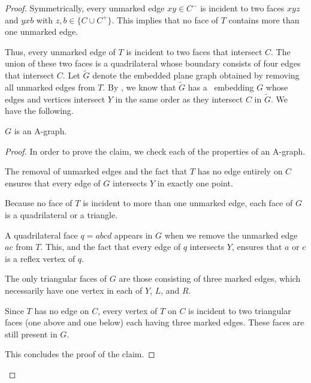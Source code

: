 \begin{proof}
	Symmetrically, every unmarked edge $xy\in C^-$ is incident to two faces
	$xyz$ and $yxb$ with $z,b\in \{C \cup C^+\}$.  This implies that no face of $T$ contains more than one unmarked edge.
	
	Thus, every unmarked edge of $T$ is incident to two faces that intersect $C$. The union of these two faces is a quadrilateral whose boundary consists of four edges that intersect $C$.
	Let $\tilde{G}$ denote the embedded plane graph obtained by removing all unmarked edges
	from $T$.  By , we know that $\tilde G$ has
	a \Fary\ embedding $G$ whose edges and vertices intersect $Y$ in the
	same order as they intersect $C$ in $\tilde{G}$. We have the following.
	
	\begin{claimx} \label{claim-a-graph}
		$G$ is an A-graph.
	\end{claimx}
	
	\begin{proof}
In order to	prove the claim, we check each of the properties of an A-graph.
	
	\begin{compactenum}
		\item The removal of unmarked edges and the fact that $T$ has no
		edge entirely on $C$ ensures that every edge of $G$ intersects $Y$
		in exactly one point.
		\item Because no face of $T$ is incident to more than one unmarked edge,
		each face of $G$ is a quadrilateral or a triangle.  
		\item A quadrilateral face $q=abcd$ appears in $G$ when we remove the unmarked edge $ac$ from $T$. This, and the fact that every edge of $q$ intersects $Y$, ensures that $a$ or $c$ is a reflex vertex of $q$.
		\item The only triangular faces of $G$ are those consisting
		of three marked edges, which necessarily have one vertex in
		each of $Y$, $L$, and $R$.
		\item Since $T$ has no edge on $C$, every vertex of $T$ on $C$
		is incident to two triangular faces (one above and one below)
		each having three marked edges. These faces are still present in $G$.
	\end{compactenum}
This concludes the proof of the claim.
\end{proof}	


\end{proof}
